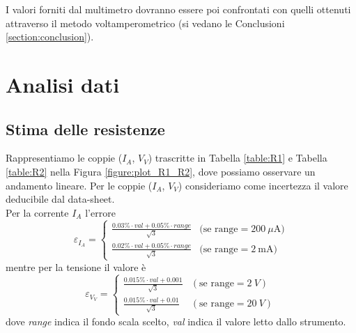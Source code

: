 \documentclass[italian, a4paper, 10pt, twocolumn]{../../style/lab_unige}
\newcommand{\reftab}[1]{Tabella {\ref{#1}}}%
\newcommand{\reffig}[1]{Figura {\ref{#1}}}%
\newcommand{\mstdErr}[1]{\varepsilon_{#1}}
\begin{document}
    I valori forniti dal multimetro dovranno essere poi confrontati con quelli ottenuti attraverso il metodo voltamperometrico (si vedano le Conclusioni \ref{section:conclusion}).


    \section{Analisi dati}
    \label{section:analysis}

    \subsection{Stima delle resistenze}

    Rappresentiamo le coppie ($I_A$, $V_V$) trascritte in \reftab{table:R1} e \reftab{table:R2} nella \reffig{figure:plot_R1_R2}, dove possiamo osservare un andamento lineare. Per le coppie ($I_A$, $V_V$) consideriamo come incertezza il valore deducibile dal data-sheet.\\
    Per la corrente $I_A$ l'errore 
    \[
        \mstdErr{I_A} =
            \begin{cases}
                \frac{0.03\%\cdot val + 0.05\%\cdot range}{\sqrt{3}} & \text{(se range}=200~\mu\text{A)}\\
                \frac{0.02\%\cdot val + 0.05\%\cdot range}{\sqrt{3}} & \text{(se range}=2~\text{mA)}
            \end{cases}
    \]
    mentre per la tensione il valore è
    \[
        \mstdErr{V_V} =
            \begin{cases}
                \frac{0.015\%\cdot val+0.001}{\sqrt{3}} & (\text{se range}=2~V)\\
                \frac{0.015\%\cdot val+0.01 }{\sqrt{3}} & (\text{se range}=20~V)
            \end{cases}
    \]
    dove \textit{range} indica il fondo scala scelto, \textit{val} indica il valore letto dallo strumento.
\end{document}
